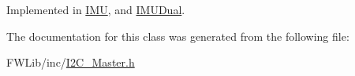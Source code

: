 Implemented in \hyperlink{class_i_m_u_a71568969beb6ee7d4b596f8c0a91faf9}{IMU}, and \hyperlink{class_i_m_u_dual_a7305a65feb3b8da6e835aaced51946a1}{IMUDual}.



The documentation for this class was generated from the following file:\begin{DoxyCompactItemize}
\item 
FWLib/inc/\hyperlink{_i2_c___master_8h}{I2C\_\-Master.h}\end{DoxyCompactItemize}
